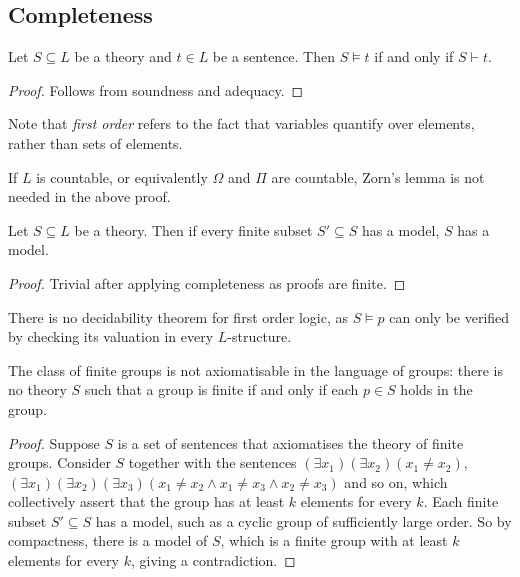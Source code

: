\subsection{Completeness}
\begin{theorem}
    Let \( S \subseteq L \) be a theory and \( t \in L \) be a sentence.
    Then \( S \models t \) if and only if \( S \vdash t \).
\end{theorem}
\begin{proof}
    Follows from soundness and adequacy.
\end{proof}
Note that \emph{first order} refers to the fact that variables quantify over elements, rather than sets of elements.
\begin{remark}
    If \( L \) is countable, or equivalently \( \Omega \) and \( \Pi \) are countable, Zorn's lemma is not needed in the above proof.
\end{remark}
\begin{theorem}
    Let \( S \subseteq L \) be a theory.
    Then if every finite subset \( S' \subseteq S \) has a model, \( S \) has a model.
\end{theorem}
\begin{proof}
    Trivial after applying completeness as proofs are finite.
\end{proof}
There is no decidability theorem for first order logic, as \( S \models p \) can only be verified by checking its valuation in every \( L \)-structure.
\begin{corollary}
    The class of finite groups is not axiomatisable in the language of groups: there is no theory \( S \) such that a group is finite if and only if each \( p \in S \) holds in the group.
\end{corollary}
\begin{proof}
    Suppose \( S \) is a set of sentences that axiomatises the theory of finite groups.
    Consider \( S \) together with the sentences \( (\exists x_1)(\exists x_2)(x_1 \neq x_2) \), \( (\exists x_1)(\exists x_2)(\exists x_3)(x_1 \neq x_2 \wedge x_1 \neq x_3 \wedge x_2 \neq x_3) \) and so on, which collectively assert that the group has at least \( k \) elements for every \( k \).
    Each finite subset \( S' \subseteq S \) has a model, such as a cyclic group of sufficiently large order.
    So by compactness, there is a model of \( S \), which is a finite group with at least \( k \) elements for every \( k \), giving a contradiction.
\end{proof}
